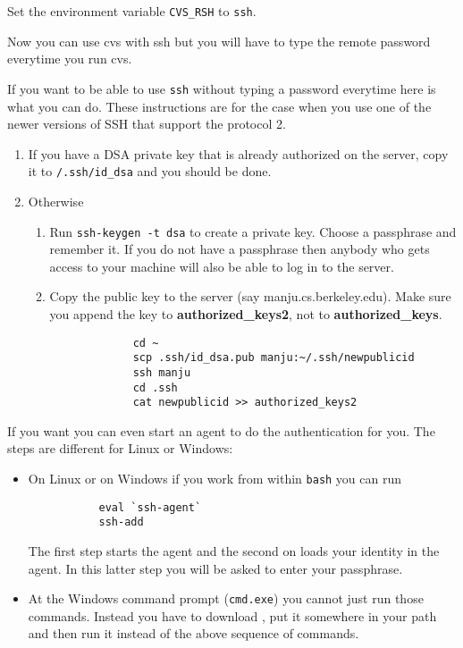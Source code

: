 \documentclass{article}
\def\t#1{{\tt #1}}
\def\cvshost{manju}
\begin{document}
 Set the environment variable \t{CVS\_RSH} to \t{ssh}. 

 Now you can use cvs with ssh but you will have to type the remote password
 everytime you run cvs. 

 If you want to be able to use \t{ssh} without typing a password everytime
here is what you can do. These instructions are for the case when you use one
of the newer versions of SSH that support the protocol 2. 

\begin{enumerate}
  \item If you have a DSA private key that is already authorized on 
        the server, copy it to \t{\home{}/.ssh/id\_dsa} and you 
        should be done.
  \item Otherwise
     \begin{enumerate}
       \item Run \t{ssh-keygen -t dsa} to create a private key. 
        Choose a passphrase and remember it. 
        If you do not have a passphrase then anybody who gets
        access to your machine will also be able to log in to the server.
       \item Copy the public key to the server (say \cvshost.cs.berkeley.edu).
          Make sure you append the key to {\bf authorized\_keys2}, not to {\bf
          authorized\_keys}.  
             \begin{verbatim}
             cd ~
             scp .ssh/id_dsa.pub manju:~/.ssh/newpublicid
             ssh manju
             cd .ssh
             cat newpublicid >> authorized_keys2
             \end{verbatim}
     \end{enumerate}
\end{enumerate}


\item If you want you can even start an agent to do the authentication for
you. The steps are different for Linux or Windows:
   \begin{itemize}
     \item On Linux or on Windows if you work from within \t{bash} you can run
        \begin{verbatim} 
           eval `ssh-agent`
           ssh-add
        \end{verbatim}

       The first step starts the agent and the second on loads your identity
       in the agent. In this latter step you will be asked to enter your
       passphrase. 
     \item At the Windows command prompt (\t{cmd.exe}) you cannot just run
       those commands. Instead you have to download
       ,  
       put it somewhere in your path and then run it instead of the above
       sequence of commands. 
   \end{itemize}
\end{document}
